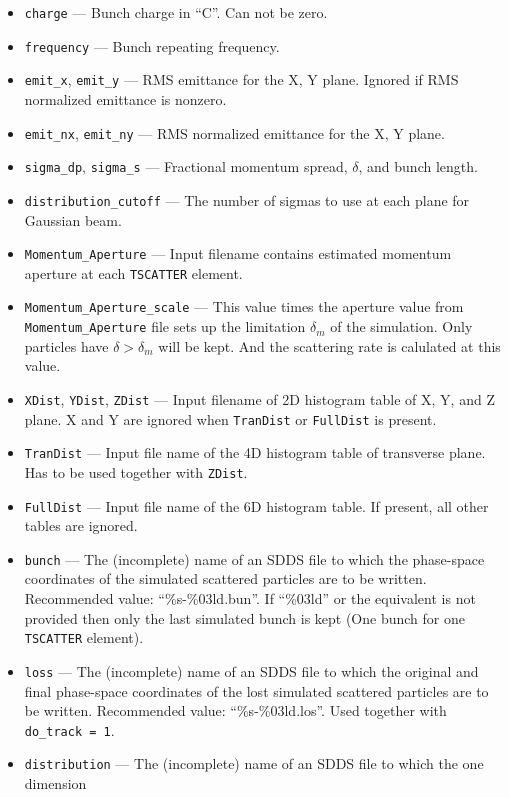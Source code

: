 \documentclass[11pt]{article}
\begin{document}
\begin{itemize}
   \item \verb|charge| --- Bunch charge in ``C''. Can not be zero.
   \item \verb|frequency| --- Bunch repeating frequency.
   \item \verb|emit_x|, \verb|emit_y| --- RMS emittance for the X, Y plane. Ignored 
   if RMS normalized emittance is nonzero.
   \item \verb|emit_nx|, \verb|emit_ny| --- RMS normalized emittance for the X, Y plane.
   \item \verb|sigma_dp|, \verb|sigma_s| --- Fractional momentum spread, $\delta$, and bunch length.
   \item \verb|distribution_cutoff| --- The number of sigmas to use at each plane for Gaussian beam.
   \item \verb|Momentum_Aperture| --- Input filename contains estimated momentum aperture at each
   \verb|TSCATTER| element.
   \item \verb|Momentum_Aperture_scale| --- This value times the aperture value from \verb|Momentum_Aperture|
   file sets up the limitation $\delta_m$ of the simulation. Only particles have $\delta>\delta_m$ 
   will be kept. And the scattering rate is calulated at this value.
   \item \verb|XDist|, \verb|YDist|, \verb|ZDist| --- Input filename of 2D histogram table of X, Y, and Z plane. 
   X and Y are ignored when \verb|TranDist| or \verb|FullDist| is present. 
   \item \verb|TranDist| --- Input file name of the 4D histogram table of transverse plane. 
   Has to be used together with \verb|ZDist|.
   \item \verb|FullDist| --- Input file name of the 6D histogram table. If present, all other 
   tables are ignored.
   \item \verb|bunch| --- The (incomplete) name of an SDDS file to which the phase-space coordinates of 
   the simulated scattered particles are to be written. Recommended value: ``\%s-\%03ld.bun''. If ``\%03ld''
   or the equivalent is not provided then only the last simulated bunch is kept (One bunch for one \verb|TSCATTER| element).
   \item \verb|loss| --- The (incomplete) name of an SDDS file to which the original and final 
   phase-space coordinates of the lost simulated scattered particles are to be written. 
   Recommended value: ``\%s-\%03ld.los''. Used together with \verb|do_track = 1|.
   \item \verb|distribution| --- The (incomplete) name of an SDDS file to which the one dimension 

\end{itemize}
\end{document}
